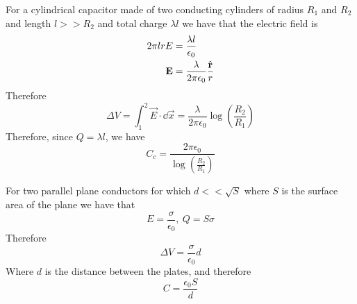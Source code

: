 \documentclass[../electromagnetism]{subfiles}
\begin{document}
\begin{eg}
	For a cylindrical capacitor made of two conducting cylinders of radius $R_1$ and $R_2$ and length $l>>R_2$ and total charge $\lambda l$ we have that the electric field is
	\begin{equation*}
		\begin{aligned}
			2\pi lrE&=\frac{\lambda l}{\epsilon_0}\\
			\mathbf{E}&=\frac{\lambda}{2\pi\epsilon_0}\frac{\hat{\mathbf{r}}}{r}
		\end{aligned}
	\end{equation*}
	Therefore
	\begin{equation*}
		\Delta V=\int_{1}^{2}\vec{E}\cdot\dd\vec{x}=\frac{\lambda}{2\pi\epsilon_0}\log\left( \frac{R_2}{R_1} \right)
	\end{equation*}
	Therefore, since $Q=\lambda l$, we have
	\begin{equation}
		C_c=\frac{2\pi\epsilon_0}{\log\left( \frac{R_2}{R_1} \right)}
		\label{eq:cylcap}
	\end{equation}
\end{eg}
\begin{eg}
	For two parallel plane conductors for which $d<<\sqrt{S}$ where $S$ is the surface area of the plane we have that
	\begin{equation*}
		E=\frac{\sigma}{\epsilon_0},\ Q=S\sigma
	\end{equation*}
	Therefore
	\begin{equation*}
		\Delta V=\frac{\sigma}{\epsilon_0}d
	\end{equation*}
	Where $d$ is the distance between the plates, and therefore
	\begin{equation}
		C=\frac{\epsilon_0S}{d}
		\label{eq:parallelplane}
	\end{equation}
\end{eg}
\end{document}

